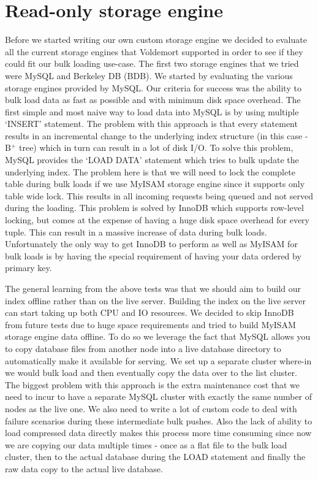 \documentclass[10pt,twocolumn,preprint,natbib,authoryear]{sigplanconf}
\begin{document}

\section{Read-only storage engine}
\label{sec:read_only}

Before we started writing our own custom storage engine we decided to evaluate all the current storage engines that Voldemort supported in order to see if they could fit our bulk loading use-case. The first two storage engines that we tried were MySQL and Berkeley DB (BDB). We started by evaluating the various storage engines provided by MySQL. Our criteria for success was the ability to bulk load data as fast as possible and with minimum disk space overhead. The first simple and most naive way to load data into MySQL is by using multiple `INSERT' statement. The problem with this approach is that every statement results in an incremental change to the underlying index structure (in this case - B$^{+}$ tree) which in turn can result in a lot of disk I/O. To solve this problem, MySQL provides the `LOAD DATA' statement which tries to bulk update the underlying index. The problem here is that we will need to lock the complete table during bulk loads if we use MyISAM storage engine since it supports only table wide lock. This results in all incoming requests being queued and not served during the loading. This problem is solved by InnoDB which supports row-level locking, but comes at the expense of having a huge disk space overhead for every tuple. This can result in a massive increase of data during bulk loads. Unfortunately the only way to get InnoDB to perform as well as MyISAM for bulk loads is by having the special requirement of having your data ordered by primary key. 

The general learning from the above tests was that we should aim to build our index offline rather than on the live server. Building the index on the live server can start taking up both CPU and IO resources. We decided to skip InnoDB from future tests due to huge space requirements and tried to build MyISAM storage engine data offline. To do so we leverage the fact that MySQL allows you to copy database files from another node into a live database directory to automatically make it available for serving. We set up a separate cluster where-in we would bulk load and then eventually copy the data over to the list cluster. The biggest problem with this approach is the extra maintenance cost that we need to incur to have a separate MySQL cluster with exactly the same number of nodes as the live one. We also need to write a lot of custom code to deal with failure scenarios during these intermediate bulk pushes. Also the lack of ability to load compressed data directly makes this process more time consuming since now we are copying our data multiple times - once as a flat file to the bulk load cluster, then to the actual database during the LOAD statement and finally the raw data copy to the actual live database. 
\end{document}
